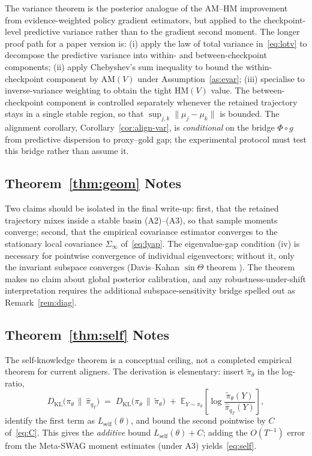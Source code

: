 \documentclass[10pt]{article}
\theoremstyle{plain}
\theoremstyle{definition}
\theoremstyle{remark}
\newcommand{\E}{\mathbb{E}}
\newcommand{\KL}{D_{\mathrm{KL}}}
\newcommand{\HM}{\mathrm{HM}}
\newcommand{\AM}{\mathrm{AM}}
\begin{document}
The variance theorem is the posterior analogue of the AM--HM improvement from evidence-weighted policy gradient estimators, but applied to the checkpoint-level predictive variance rather than to the gradient second moment. The longer proof path for a paper version is: (i) apply the law of total variance in~\eqref{eq:lotv} to decompose the predictive variance into within- and between-checkpoint components; (ii) apply Chebyshev's sum inequality \citep[\S2.17]{HardyLittlewoodPolya1952} to bound the within-checkpoint component by $\AM(V)$ under Assumption~\ref{as:evar}; (iii) specialise to inverse-variance weighting to obtain the tight $\HM(V)$ value. The between-checkpoint component is controlled separately whenever the retained trajectory stays in a single stable region, so that $\sup_{j,k}\|\mu_j-\mu_k\|$ is bounded. The alignment corollary, Corollary~\ref{cor:align-var}, is \emph{conditional} on the bridge $\Phi\circ g$ from predictive dispersion to proxy--gold gap; the experimental protocol must test this bridge rather than assume it.

\subsection{Theorem~\ref{thm:geom} Notes}

Two claims should be isolated in the final write-up: first, that the retained trajectory mixes inside a stable basin (A2)--(A3), so that sample moments converge; second, that the empirical covariance estimator converges to the stationary local covariance $\Sigma_\infty$ of~\eqref{eq:lyap}. The eigenvalue-gap condition (iv) is necessary for pointwise convergence of individual eigenvectors; without it, only the invariant subspace converges (Davis--Kahan $\sin\Theta$ theorem \citep{DavisKahan1970}). The theorem makes no claim about global posterior calibration, and any robustness-under-shift interpretation requires the additional subspace-sensitivity bridge spelled out as Remark~\ref{rem:diag}.

\subsection{Theorem~\ref{thm:self} Notes}

The self-knowledge theorem is a conceptual ceiling, not a completed empirical theorem for current aligners. The derivation is elementary: insert $\tilde\pi_\theta$ in the log-ratio,
\begin{equation}\label{eq:self-app}
\KL\!\bigl(\pi_\theta \,\big\|\, \hat\pi_{q_T}\bigr)
\;=\;
\KL\!\bigl(\pi_\theta \,\big\|\, \tilde\pi_\theta\bigr)
\;+\;
\E_{Y\sim\pi_\theta}\!\left[\log \frac{\tilde\pi_\theta(Y)}{\hat\pi_{q_T}(Y)}\right],
\end{equation}
identify the first term as $L_{\mathrm{self}}(\theta)$, and bound the second pointwise by $C$ of~\eqref{eq:C}. This gives the \emph{additive} bound $L_{\mathrm{self}}(\theta) + C$; adding the $O(T^{-1})$ error from the Meta-SWAG moment estimates (under A3) yields~\eqref{eq:self}.
\end{document}
